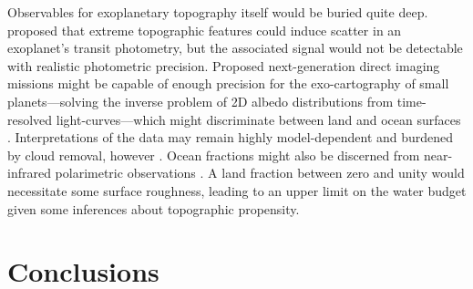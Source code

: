 \documentclass[trackchanges]{aastex63}
\newcommand{\todo}[1]{\textit{\textcolor{violet}{{#1}}}}
\begin{document}
Observables for exoplanetary topography itself would be buried quite deep. \citet{mctier_finding_2018} proposed that extreme topographic features could induce scatter in an exoplanet's transit photometry, but the associated signal would not be detectable with realistic photometric precision. Proposed next-generation direct imaging missions might be capable of enough precision for the exo-cartography of small planets---solving the inverse problem of 2D albedo distributions from time-resolved light-curves---which might discriminate between land and ocean surfaces \citep{cowan_mapping_2018, farr_exocartographer_2018, lustig-yaeger_detecting_2018, kawahara_global_2020, aizawa_global_2020}. Interpretations of the data may remain highly model-dependent and burdened by cloud removal, however \citep{paradise_fundamental_2021, teinturier_mapping_2022}. Ocean fractions might also be discerned from near-infrared polarimetric observations \citep{takahashi_polarimetric_2021}. A land fraction between zero and unity would necessitate some surface roughness, leading to an upper limit on the water budget given some inferences about topographic propensity. %






\section{Conclusions}
\end{document}

